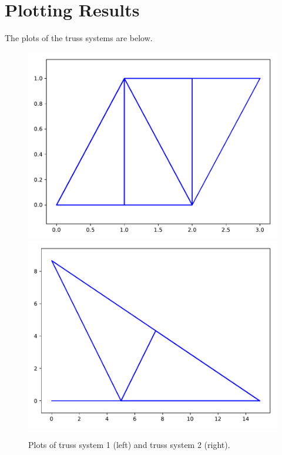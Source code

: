 \documentclass[11pt]{amsart}
\theoremstyle{definition}
\begin{document}
\section{Plotting Results}
The plots of the truss systems are below.
\begin{figure}[h]
\centerline{\includegraphics[scale=.4]{Figure1.pdf} \includegraphics[scale=.4]{Figure2.pdf}}
\caption{Plots of truss system 1 (left) and truss system 2 (right).}
\end{figure}
\end{document}
